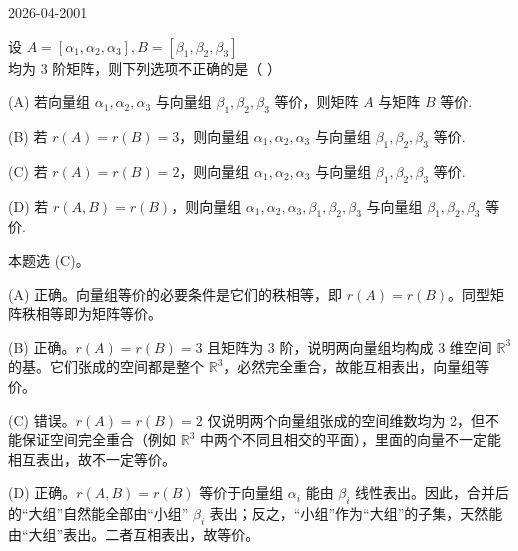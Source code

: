 \begin{mistake}{2026-04-20}{01}

\begin{problemcontent}
设 \(A = [\alpha_1, \alpha_2, \alpha_3], B = [\beta_1, \beta_2, \beta_3]\) 均为 3 阶矩阵，则下列选项不正确的是（ ）

(A) 若向量组 \(\alpha_1, \alpha_2, \alpha_3\) 与向量组 \(\beta_1, \beta_2, \beta_3\) 等价，则矩阵 \(A\) 与矩阵 \(B\) 等价.

(B) 若 \(r(A) = r(B) = 3\)，则向量组 \(\alpha_1, \alpha_2, \alpha_3\) 与向量组 \(\beta_1, \beta_2, \beta_3\) 等价.

(C) 若 \(r(A) = r(B) = 2\)，则向量组 \(\alpha_1, \alpha_2, \alpha_3\) 与向量组 \(\beta_1, \beta_2, \beta_3\) 等价.

(D) 若 \(r(A, B) = r(B)\)，则向量组 \(\alpha_1, \alpha_2, \alpha_3, \beta_1, \beta_2, \beta_3\) 与向量组 \(\beta_1, \beta_2, \beta_3\) 等价.
\end{problemcontent}

\begin{solutioncontent}
本题选 (C)。

(A) 正确。向量组等价的必要条件是它们的秩相等，即 \(r(A) = r(B)\)。同型矩阵秩相等即为矩阵等价。

(B) 正确。\(r(A) = r(B) = 3\) 且矩阵为 3 阶，说明两向量组均构成 3 维空间 \(\mathbb{R}^3\) 的基。它们张成的空间都是整个 \(\mathbb{R}^3\)，必然完全重合，故能互相表出，向量组等价。

(C) 错误。\(r(A) = r(B) = 2\) 仅说明两个向量组张成的空间维数均为 2，但不能保证空间完全重合（例如 \(\mathbb{R}^3\) 中两个不同且相交的平面），里面的向量不一定能相互表出，故不一定等价。

(D) 正确。\(r(A, B) = r(B)\) 等价于向量组 \(\alpha_i\) 能由 \(\beta_i\) 线性表出。因此，合并后的“大组”自然能全部由“小组” \(\beta_i\) 表出；反之，“小组”作为“大组”的子集，天然能由“大组”表出。二者互相表出，故等价。
\end{solutioncontent}


\end{mistake}
